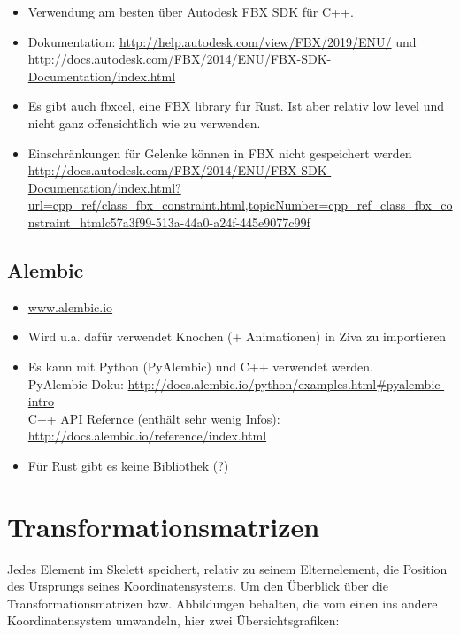\begin{itemize}
 \item Verwendung am besten über Autodesk FBX SDK für C++. 
 \item Dokumentation: \url{http://help.autodesk.com/view/FBX/2019/ENU/} und \url{http://docs.autodesk.com/FBX/2014/ENU/FBX-SDK-Documentation/index.html}
 \item Es gibt auch fbxcel, eine FBX library für Rust. Ist aber relativ low level und nicht ganz offensichtlich wie zu verwenden.
 \item Einschränkungen für Gelenke können in FBX nicht gespeichert werden \url{http://docs.autodesk.com/FBX/2014/ENU/FBX-SDK-Documentation/index.html?url=cpp_ref/class_fbx_constraint.html,topicNumber=cpp_ref_class_fbx_constraint_htmlc57a3f99-513a-44a0-a24f-445e9077c99f}
\end{itemize}

\subsection{Alembic}

\begin{itemize}
 \item \url{www.alembic.io}
 \item Wird u.a. dafür verwendet Knochen (+ Animationen) in Ziva zu importieren
 \item Es kann mit Python (PyAlembic) und C++ verwendet werden.\\
 PyAlembic Doku: \url{http://docs.alembic.io/python/examples.html#pyalembic-intro}\\
 C++ API Refernce (enthält sehr wenig Infos): \url{http://docs.alembic.io/reference/index.html}
 \item Für Rust gibt es keine Bibliothek (?)
\end{itemize}


\section{Transformationsmatrizen}
\label{implementation_detail_matrices}


Jedes Element im Skelett speichert, relativ zu seinem Elternelement, die Position des Ursprungs seines Koordinatensystems. Um den Überblick über die Transformationsmatrizen bzw. Abbildungen behalten, die vom einen ins andere Koordinatensystem umwandeln, hier zwei Übersichtsgrafiken:

